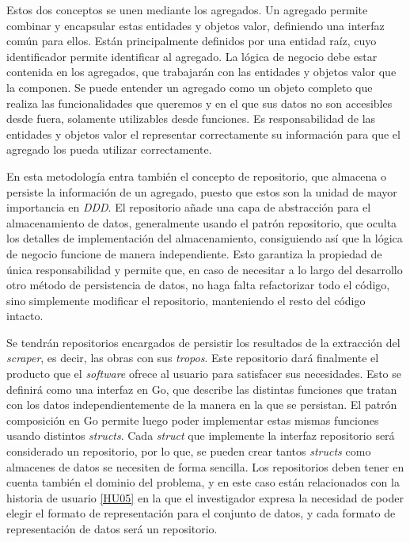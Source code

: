 Estos dos conceptos se unen mediante los agregados. Un agregado permite combinar
y encapsular estas entidades y objetos valor, definiendo una interfaz común para
ellos. Están principalmente definidos por una entidad raíz, cuyo identificador
permite identificar al agregado. La lógica de negocio debe estar contenida en
los agregados, que trabajarán con las entidades y objetos valor que la componen.
Se puede entender un agregado como un objeto completo que realiza las
funcionalidades que queremos y en el que sus datos no son accesibles desde
fuera, solamente utilizables desde funciones. Es responsabilidad de las
entidades y objetos valor el representar correctamente su información para que
el agregado los pueda utilizar correctamente.

En esta metodología entra también el concepto de repositorio, que almacena o
persiste la información de un agregado, puesto que estos son la unidad de mayor
importancia en \textit{DDD}. El repositorio añade una capa de abstracción para
el almacenamiento de datos, generalmente usando el patrón repositorio, que
oculta los detalles de implementación del almacenamiento, consiguiendo así que
la lógica de negocio funcione de manera independiente. Esto garantiza la
propiedad de única responsabilidad y permite que, en caso de necesitar a lo
largo del desarrollo otro método de persistencia de datos, no haga falta
refactorizar todo el código, sino simplemente modificar el repositorio,
manteniendo el resto del código intacto. 

Se tendrán repositorios encargados de persistir los resultados de la extracción
del \textit{scraper}, es decir, las obras con sus \textit{tropos}. Este
repositorio dará finalmente el producto que el \textit{software} ofrece al
usuario para satisfacer sus necesidades. Esto se definirá como una interfaz en
Go, que describe las distintas funciones que tratan con los datos
independientemente de la manera en la que se persistan. El patrón composición en
Go permite luego poder implementar estas mismas funciones usando distintos
\textit{structs}. Cada \textit{struct} que implemente la interfaz repositorio
será considerado un repositorio, por lo que, se pueden crear tantos
\textit{structs} como almacenes de datos se necesiten de forma sencilla. Los
repositorios deben tener en cuenta también el dominio del problema, y en este
caso están relacionados con la historia de usuario
\href{https://github.com/jlgallego99/TropesToGo/issues/30}{[HU05]} en la que el
investigador expresa la necesidad de poder elegir el formato de representación
para el conjunto de datos, y cada formato de representación de datos será un
repositorio.

